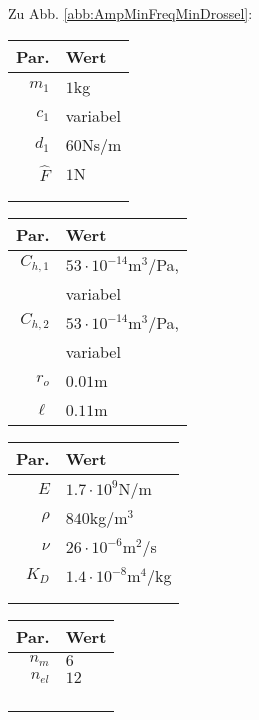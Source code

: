 Zu Abb. \ref{abb:AmpMinFreqMinDrossel}:
\begin{center}
\begin{tabular}{r|l}
Par. &Wert\\\hline
$m_1$&$1$kg\\
$c_{1}$& variabel\\
$d_{1}$&$60$Ns/m \\
$\hat{F}$&$1$N\\
&\\
&
\end{tabular}\hfill
\begin{tabular}{r|l}
Par. &Wert\\\hline
$C_{h,1}$&$53\cdot10^{-14}$m$^3$/Pa,\\
&variabel\\
$C_{h,2}$&$53\cdot10^{-14}$m$^3$/Pa,\\
&variabel\\
$r_o$&$0.01$m\\
$\ell$&$0.11$m\\
\end{tabular}\hfill
\begin{tabular}{r|l}
Par. &Wert\\\hline
$E$&$1.7\cdot10^{9}$N/m\\
$\rho$&$840$kg/m$^3$\\
$\nu$&$26\cdot10^{-6}$m$^2$/s\\
$K_D$&$1.4\cdot10^{-8}$m$^4$/kg\\
&\\
&
\end{tabular}\hfill
\begin{tabular}{r|l}
Par. &Wert\\\hline
$n_m$& $6$ \\
$n_{el}$& $12$ \\
&\\
&\\
&\\
&
\end{tabular} 
\end{center}


